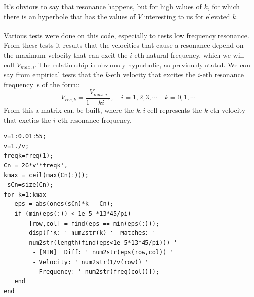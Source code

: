 \documentclass[10pt,a4paper,final]{report}
\begin{document}
It's obvious to say that resonance happens, but for high values of $k$, for which there is an hyperbole that has the values of $V$ interesting to us for elevated $k$.\\ \\
Various tests were done on this code, especially to tests low frequency resonance. From these tests it results that the velocities that cause a resonance depend on the maximum velocity that can excit the $i$-eth natural frequency, which we will call $V_{max,i}$. The relationship is obviously hyperbolic, as previously stated. We can say from empirical tests that the $k$-eth 
velocity that excites the $i$-eth resonance frequency is of the form::
$$V_{res,k}=\frac{V_{max,i}}{1+ki^{-1}},\quad i = 1,2,3,\cdots\quad k=0,1,\cdots$$
From this a matrix can be built, where the $k,i$ cell represents the $k$-eth velocity  that excties the $i$-eth resonance frequency.
\begin{lstlisting}
v=1:0.01:55;
v=1./v;
freqk=freq(1);
Cn = 26*v'*freqk';
kmax = ceil(max(Cn(:)));
 sCn=size(Cn);
for k=1:kmax
   eps = abs(ones(sCn)*k - Cn);
   if (min(eps(:)) < 1e-5 *13*45/pi)
       [row,col] = find(eps == min(eps(:)));
       disp(['K: ' num2str(k) '- Matches: ' 
       num2str(length(find(eps<1e-5*13*45/pi))) '
        - [MIN]  Diff: ' num2str(eps(row,col)) ' 
        - Velocity: ' num2str(1/v(row)) ' 
        - Frequency: ' num2str(freq(col))]);
   end
end
\end{lstlisting}
\end{document}
